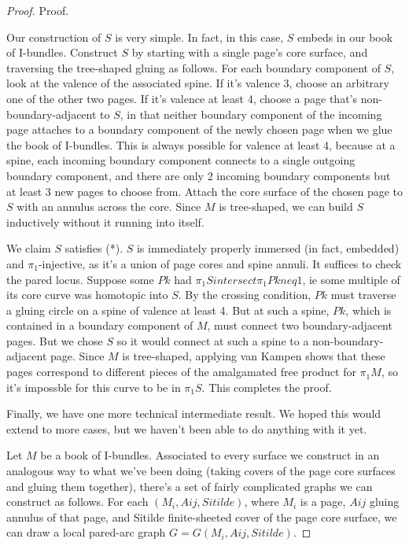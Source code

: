 \documentclass[12pt]{amsart}
\theoremstyle{definition}
\newcommand{\piinj}{$\pi_1$-injective}
\begin{document}
\begin{proof}

Proof.

Our construction of $S$ is very simple. In fact, in this case, $S$ embeds in our
book of I-bundles. Construct $S$ by starting with a single page's core surface,
and traversing the tree-shaped gluing as follows. For each boundary component
of $S$, look at the valence of the associated spine. If it's valence 3, choose an
arbitrary one of the other two pages. If it's valence at least 4, choose a page
that's non-boundary-adjacent to $S$, in that neither boundary component of the
incoming page attaches to a boundary component of the newly chosen page when we
glue the book of I-bundles. This is always possible for valence at least 4,
because at a spine, each incoming boundary component connects to a single
outgoing boundary component, and there are only 2 incoming boundary components
but at least 3 new pages to choose from. Attach the core surface of the chosen
page to $S$ with an annulus across the core. Since $M$ is tree-shaped, we can build
$S$ inductively without it running into itself.

We claim $S$ satisfies (*). $S$ is immediately properly immersed (in fact,
embedded) and \piinj, as it's a union of page cores and spine annuli. It
suffices to check the pared locus. Suppose some $Pk$ had $\pi_1S intersect \pi_1Pk neq
1$, ie some multiple of its core curve was homotopic into $S$. By the crossing
condition, $Pk$ must traverse a gluing circle on a spine of valence at least 4.
But at such a spine, $Pk$, which is contained in a boundary component of $M$, must
connect two boundary-adjacent pages. But we chose $S$ so it would
connect at such a spine to a non-boundary-adjacent page. Since $M$ is
tree-shaped, applying van Kampen shows that these pages correspond to
different pieces of the amalgamated free product for $\pi_1M$, so it's impossble
for this curve to be in $\pi_1S$. This completes the proof.

Finally, we have one more technical intermediate result. We hoped this would
extend to more cases, but we haven't been able to do anything with it yet.

Let $M$ be a book of I-bundles. Associated to every surface we construct in an
analogous way to what we've been doing (taking covers of the page core surfaces
and gluing them together), there's a set of fairly complicated graphs we can
construct as follows. For each $(M_i,Aij,Sitilde)$, where $M_i$ is a page, $Aij$ gluing
annulus of that page, and Sitilde finite-sheeted cover of the page core
surface, we can draw a local pared-arc graph $G=G(M_i,Aij,Sitilde)$.


\end{proof}
\end{document}

